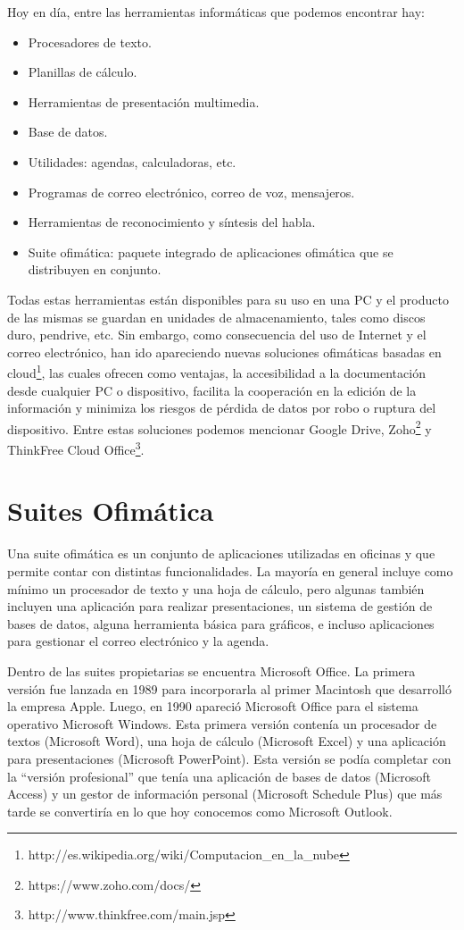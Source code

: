 \documentclass[12pt]{article}
\begin{document}
Hoy en día, entre las herramientas informáticas que podemos encontrar hay:
\begin{itemize}
\item Procesadores de texto.
\item Planillas de cálculo.
\item Herramientas de presentación multimedia.
\item Base de datos.
\item Utilidades: agendas, calculadoras, etc.
\item Programas de correo electrónico, correo de voz, mensajeros.
\item Herramientas de reconocimiento y síntesis del habla.
\item Suite ofimática: paquete integrado de aplicaciones ofimática que se distribuyen en conjunto. 
\end{itemize}

Todas estas herramientas están disponibles para su uso en una PC y el producto de las mismas se guardan en unidades de almacenamiento, tales como discos duro, pendrive, etc. Sin embargo, como consecuencia del uso de Internet y el correo electrónico, han ido apareciendo nuevas soluciones ofimáticas basadas en cloud\footnote{http://es.wikipedia.org/wiki/Computacion\_en\_la\_nube}, las cuales ofrecen como ventajas, la accesibilidad a la documentación desde cualquier PC o dispositivo, facilita la cooperación en la edición de la información y minimiza los riesgos de pérdida de datos por robo o ruptura del dispositivo. Entre estas soluciones podemos mencionar Google Drive, Zoho\footnote{https://www.zoho.com/docs/} y ThinkFree Cloud Office\footnote{http://www.thinkfree.com/main.jsp}.

\section*{Suites Ofimática}

Una suite ofimática es un conjunto de aplicaciones utilizadas en oficinas y que permite contar con distintas funcionalidades. La mayoría en general incluye como mínimo un procesador de texto y una hoja de cálculo, pero algunas también incluyen una aplicación para realizar presentaciones,  un sistema de gestión de bases de datos, alguna herramienta básica para gráficos, e incluso aplicaciones para gestionar el correo electrónico y  la agenda.

Dentro de las suites propietarias se encuentra Microsoft Office. La primera versión fue lanzada en 1989 para incorporarla al primer Macintosh que desarrolló la empresa Apple. Luego, en 1990 apareció Microsoft Office para el sistema operativo Microsoft Windows. Esta primera versión contenía un procesador de textos (Microsoft Word), una hoja de cálculo (Microsoft Excel) y una aplicación para presentaciones (Microsoft PowerPoint). Esta versión se podía completar con la “versión profesional” que tenía una aplicación de bases de datos (Microsoft Access) y un gestor de información personal (Microsoft Schedule Plus) que más tarde se convertiría en lo que hoy conocemos como Microsoft Outlook.
\end{document}
